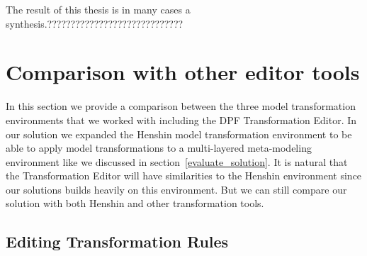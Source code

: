 The result of this thesis is in many cases a
synthesis.?????????????????????????????



\section{Comparison with other editor tools}

In this section we provide a comparison between the three model
transformation environments that we worked with including the DPF Transformation
Editor. In our solution we expanded the Henshin model transformation environment
to be able to apply model transformations to a multi-layered meta-modeling
environment like we discussed in section~\ref{evaluate_solution}. It is natural
that the Transformation Editor will have similarities to the Henshin environment
since our solutions builds heavily on this environment. But we can still
compare our solution with both Henshin and other transformation tools.
 
\subsection{Editing Transformation Rules}

